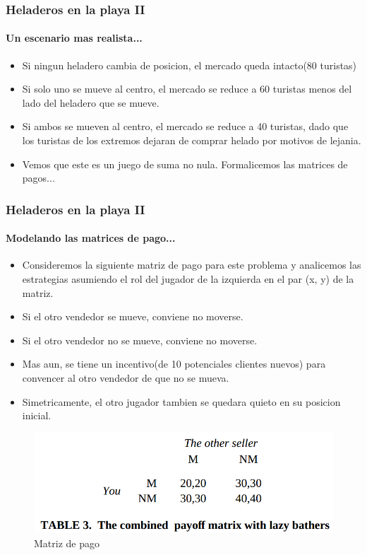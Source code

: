\documentclass{beamer}
\begin{document}
\begin{frame}
  \frametitle{Heladeros en la playa II}
  \framesubtitle{Un escenario mas realista...}
  \begin{itemize}
    \setlength{\itemsep}{4pt}
    \item Si ningun heladero cambia de posicion, el mercado queda intacto(80 turistas)
    \pause
    \item Si solo uno se mueve al centro, el mercado se reduce a 60 turistas menos del lado del heladero que se mueve.
    \pause
    \item Si ambos se mueven al centro, el mercado se reduce a 40 turistas, dado que los turistas de los extremos dejaran de comprar helado por motivos de lejania.
    \pause
    \item Vemos que este es un juego de suma no nula. Formalicemos las matrices de pagos...
  \end{itemize}
\end{frame}

\begin{frame}
  \frametitle{Heladeros en la playa II}
  \framesubtitle{Modelando las matrices de pago...}
  \begin{itemize}
    \setlength{\itemsep}{2pt}
    \item Consideremos la siguiente matriz de pago para este problema y analicemos las estrategias asumiendo el rol del jugador de la izquierda en el par (x, y) de la matriz.
    \pause
    \item Si el otro vendedor se mueve, conviene no moverse.
    \pause    
    \item Si el otro vendedor no se mueve, conviene no moverse.
    \pause
    \item Mas aun, se tiene un incentivo(de 10 potenciales clientes nuevos) para convencer al otro vendedor de que no se mueva.
    \pause
    \item Simetricamente, el otro jugador tambien se quedara quieto en su posicion inicial.
    \pause
  \end{itemize}

  \begin{figure}[h!]
      \centering        
      \includegraphics[scale=0.20]{fig/nonzero-matrices-pago-playa.png}
      \caption{Matriz de pago}
  \end{figure}
\end{frame}
\end{document}
